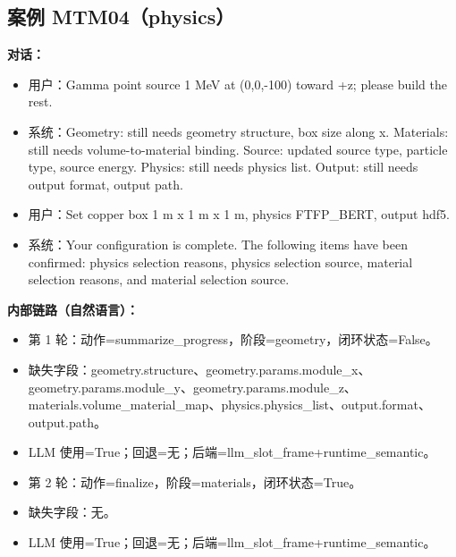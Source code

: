 \documentclass[11pt]{ctexart}
\begin{document}
\subsection{案例 MTM04（physics）}
\textbf{对话：}
\begin{itemize}
\item 用户：Gamma point source 1 MeV at (0,0,-100) toward +z; please build the rest.
\item 系统：Geometry: still needs geometry structure, box size along x. Materials: still needs volume-to-material binding. Source: updated source type, particle type, source energy. Physics: still needs physics list. Output: still needs output format, output path.
\item 用户：Set copper box 1 m x 1 m x 1 m, physics FTFP\_BERT, output hdf5.
\item 系统：Your configuration is complete. The following items have been confirmed: physics selection reasons, physics selection source, material selection reasons, and material selection source.
\end{itemize}
\textbf{内部链路（自然语言）：}
\begin{itemize}
\item 第 1 轮：动作=summarize\_progress，阶段=geometry，闭环状态=False。
\item 缺失字段：geometry.structure、geometry.params.module\_x、geometry.params.module\_y、geometry.params.module\_z、materials.volume\_material\_map、physics.physics\_list、output.format、output.path。
\item LLM 使用=True；回退=无；后端=llm\_slot\_frame+runtime\_semantic。
\item 第 2 轮：动作=finalize，阶段=materials，闭环状态=True。
\item 缺失字段：无。
\item LLM 使用=True；回退=无；后端=llm\_slot\_frame+runtime\_semantic。
\end{itemize}
\end{document}
